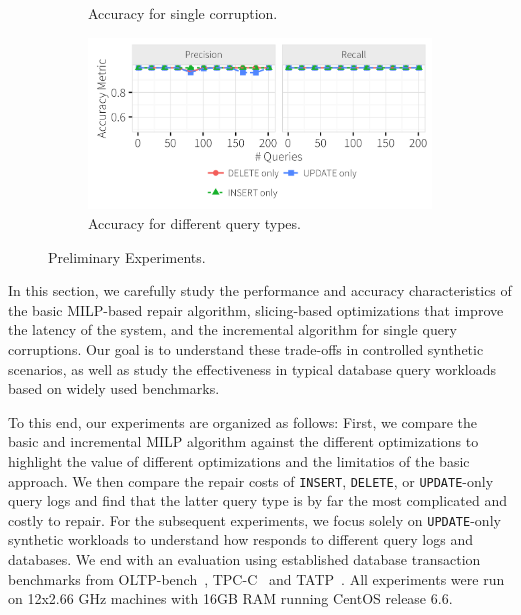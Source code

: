 \begin{figure}[h]
\begin{subfigure}[t]{.3\textwidth}
    \vspace*{-.25in}
    \caption{Accuracy for single corruption.}
    \label{f:singlequeryinc_acc} 
    \end{subfigure}
    \begin{subfigure}[t]{.3\textwidth}
    \includegraphics[width = .99\columnwidth]{figures/indelup_pr}
    \vspace*{-.25in}
    \caption{Accuracy for different query types.}
    \label{f:indelup_acc} 
    \end{subfigure}
    \vspace*{-.1in}
    \caption{Preliminary Experiments.}
  \end{figure}


In this section, we carefully study the performance and accuracy
characteristics of the basic MILP-based repair algorithm, 
slicing-based optimizations that improve the latency of the system, 
and the incremental algorithm for single query corruptions. 
Our goal is to understand these trade-offs in
controlled synthetic scenarios, as well as study the effectiveness
in typical database query workloads based on widely used benchmarks.


To this end, our experiments are organized as follows: First, 
we compare the basic and incremental MILP algorithm against the different optimizations 
to highlight the value of different optimizations and the limitatios of the basic approach.  
We then compare the repair costs of \texttt{INSERT}, \texttt{DELETE}, or \texttt{UPDATE}-only query logs 
and find that the latter query type is by far the most complicated and costly to repair.
For the subsequent experiments, we focus solely on \texttt{UPDATE}-only synthetic workloads 
to understand how \sys responds to different query logs and databases.  
We end with an evaluation using established database transaction benchmarks from OLTP-bench~\cite{difallah2013oltp},
TPC-C~\cite{tpcc} and TATP~\cite{tatp}. 
All experiments were run on 12x2.66 GHz  machines with 16GB RAM running CentOS release 6.6.



